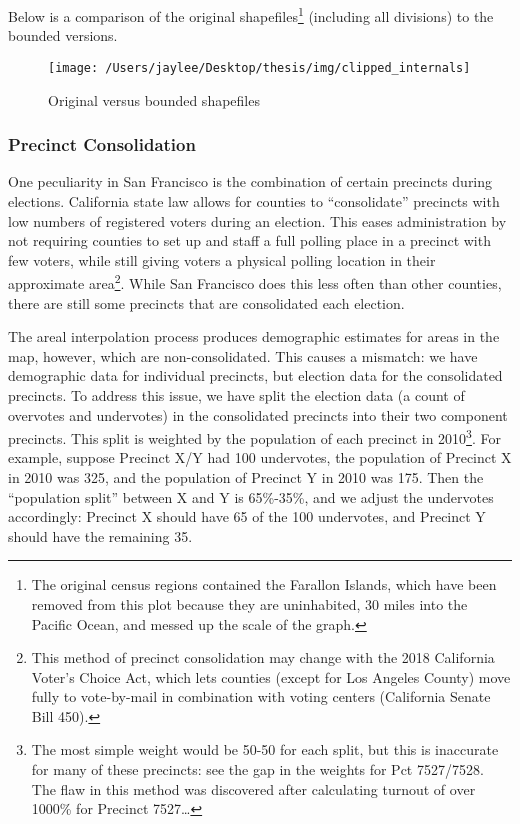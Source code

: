 \documentclass[12pt,twoside]{reedthesis}
\theoremstyle{definition}
\theoremstyle{definition}
\theoremstyle{definition}
\theoremstyle{remark}
\begin{document}
Below is a comparison of the original shapefiles\footnote{The original
  census regions contained the Farallon Islands, which have been removed
  from this plot because they are uninhabited, 30 miles into the Pacific
  Ocean, and messed up the scale of the graph.} (including all
divisions) to the bounded versions.
\begin{figure}
\texttt{[image: /Users/jaylee/Desktop/thesis/img/clipped\_internals]} \caption{Original versus bounded shapefiles}\label{fig:unnamed-chunk-8}
\end{figure}
\hypertarget{precinct-consolidation}{%
\subsubsection{Precinct Consolidation}\label{precinct-consolidation}}

One peculiarity in San Francisco is the combination of certain precincts
during elections. California state law allows for counties to
``consolidate'' precincts with low numbers of registered voters during
an election. This eases administration by not requiring counties to set
up and staff a full polling place in a precinct with few voters, while
still giving voters a physical polling location in their approximate
area\footnote{This method of precinct consolidation may change with the
  2018 California Voter's Choice Act, which lets counties (except for
  Los Angeles County) move fully to vote-by-mail in combination with
  voting centers (California Senate Bill 450).}. While San Francisco
does this less often than other counties, there are still some precincts
that are consolidated each election.

The areal interpolation process produces demographic estimates for areas
in the map, however, which are non-consolidated. This causes a mismatch:
we have demographic data for individual precincts, but election data for
the consolidated precincts. To address this issue, we have split the
election data (a count of overvotes and undervotes) in the consolidated
precincts into their two component precincts. This split is weighted by
the population of each precinct in 2010\footnote{The most simple weight
  would be 50-50 for each split, but this is inaccurate for many of
  these precincts: see the gap in the weights for Pct 7527/7528. The
  flaw in this method was discovered after calculating turnout of over
  1000\% for Precinct 7527\ldots{}}. For example, suppose Precinct X/Y
had 100 undervotes, the population of Precinct X in 2010 was 325, and
the population of Precinct Y in 2010 was 175. Then the ``population
split'' between X and Y is 65\%-35\%, and we adjust the undervotes
accordingly: Precinct X should have 65 of the 100 undervotes, and
Precinct Y should have the remaining 35.
\end{document}
